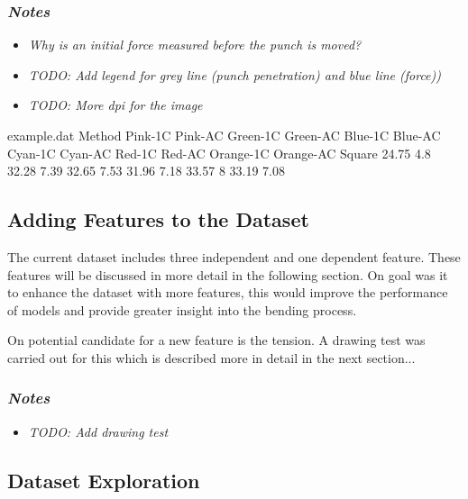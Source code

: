 \subsubsection*{\textit{Notes}}
\begin{itemize}
    \item \textit{Why is an initial force measured before the punch is moved?}
    \item \textit{TODO: Add legend for grey line (punch penetration) and blue
    line (force))}
    \item \textit{TODO: More dpi for the image}
\end{itemize}


\begin{filecontents*}{example.dat}
    Method Pink-1C Pink-AC Green-1C Green-AC Blue-1C Blue-AC Cyan-1C Cyan-AC
    Red-1C Red-AC
    Orange-1C Orange-AC
    Square 24.75 4.8 32.28 7.39 32.65 7.53 31.96 7.18 33.57 8 33.19 7.08
\end{filecontents*}


\label{sec:dataset_exploration}

\subsection{Adding Features to the
Dataset}\label{subsec:adding-features-to-the-dataset}
The current dataset includes three independent and one dependent feature.
These features
will be discussed in more detail in the following section.
On goal was it to enhance the dataset with more features, this would improve
the performance of models and provide greater insight into the bending process.

On potential candidate for a new feature is the tension. A drawing test was
carried out for this
which is described more in detail in the next section...

\subsubsection*{\textit{Notes}}
\begin{itemize}
    \item \textit{TODO: Add drawing test}
\end{itemize}

\subsection{Dataset Exploration}\label{subsec:dataset-exploration}

